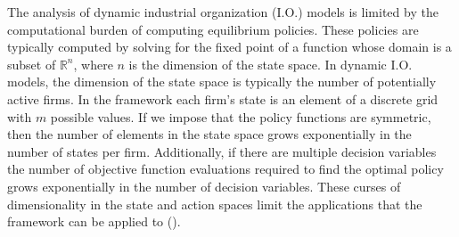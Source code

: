 \documentclass[12pt]{article}
\begin{document}


The analysis of dynamic industrial organization (I.O.) models is limited by the computational burden of computing equilibrium policies. These policies are typically computed by solving for the fixed point of a function whose domain is a subset of $\mathbb{R}^n$, where $n$ is the dimension of the state space. In dynamic I.O. models, the dimension of the state space is typically the number of potentially active firms. In the \citet{1995_Erickson_Pakes_RES} framework each firm's state is an element of a discrete grid with $m$ possible values. If we impose that the policy functions are symmetric, then the number of elements in the state space grows exponentially in the number of states per firm. Additionally, if there are multiple decision variables the number of objective function evaluations required to find the optimal policy grows exponentially in the number of decision variables. These curses of dimensionality in the state and action spaces limit the applications that the \citet{1995_Erickson_Pakes_RES} framework can be applied to (\cite{2001_Pakes_McGuire_RAND, 2008_Weintraub_Benkard_VanRoy_Econometrica, 2007_Doraszelski_Judd, 2011_Aguirregabiria_Nevo_working}).
\end{document}

